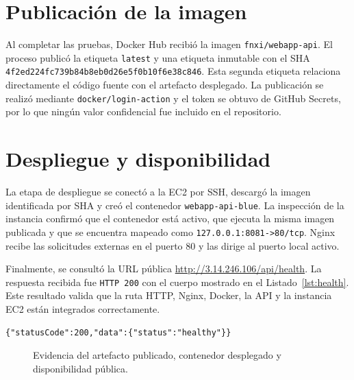 \documentclass[12pt,a4paper]{report}
\begin{document}
\section{Publicación de la imagen}

Al completar las pruebas, Docker Hub recibió la imagen \texttt{fnxi/webapp-api}. El proceso publicó la etiqueta \texttt{latest} y una etiqueta inmutable con el SHA \texttt{4f2ed224fc739b84b8eb0d26e5f0b10f6e38c846}. Esta segunda etiqueta relaciona directamente el código fuente con el artefacto desplegado. La publicación se realizó mediante \texttt{docker/login-action} y el token se obtuvo de GitHub Secrets, por lo que ningún valor confidencial fue incluido en el repositorio.

\section{Despliegue y disponibilidad}

La etapa de despliegue se conectó a la EC2 por SSH, descargó la imagen identificada por SHA y creó el contenedor \texttt{webapp-api-blue}. La inspección de la instancia confirmó que el contenedor está activo, que ejecuta la misma imagen publicada y que se encuentra mapeado como \texttt{127.0.0.1:8081->80/tcp}. Nginx recibe las solicitudes externas en el puerto 80 y las dirige al puerto local activo.

Finalmente, se consultó la URL pública \url{http://3.14.246.106/api/health}. La respuesta recibida fue \texttt{HTTP 200} con el cuerpo mostrado en el Listado~\ref{lst:health}. Este resultado valida que la ruta HTTP, Nginx, Docker, la API y la instancia EC2 están integrados correctamente.

\begin{lstlisting}[caption={Respuesta del endpoint público de salud.},label={lst:health}]
{"statusCode":200,"data":{"status":"healthy"}}
\end{lstlisting}

\begin{figure}[H]
\centering
{}
\caption{Evidencia del artefacto publicado, contenedor desplegado y disponibilidad pública.}
\label{fig:deployment-result}
\end{figure}
\end{document}
